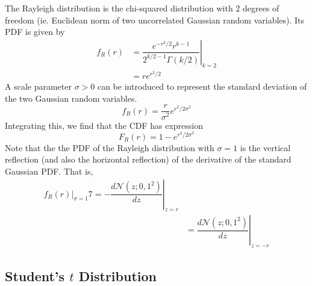 \documentclass[11pt]{report} %
\begin{document}
The Rayleigh distribution is the chi-squared distribution with 2 degrees of freedom (ie. Euclidean norm of two uncorrelated Gaussian random variables). Its PDF is given by
\begin{align}
f_{R}\left(r\right) &= \left.\dfrac{e^{-r^{2}/2}r^{k - 1}}{2^{k/2 - 1}\Gamma\left(k/2\right)}\right|_{k = 2}  \\
&= re^{r^{2}/2}
\end{align}
A scale parameter $\sigma > 0$  can be introduced to represent the standard deviation of the two Gaussian random variables.
\begin{equation}
f_{R}\left(r\right) = \dfrac{r}{\sigma^{2}}e^{r^{2}/2\sigma^{2}}
\end{equation}
Integrating this, we find that the CDF has expression
\begin{equation}
F_{R}\left(r\right) = 1 - e^{r^{2}/2\sigma^{2}}
\end{equation}
Note that the the PDF of the Rayleigh distribution with $\sigma = 1$ is the vertical reflection (and also the horizontal reflection) of the derivative of the standard Gaussian PDF. That is,
\begin{align}
\left.f_{R}\left(r\right)\right|_{\sigma = 1} 7= -\left.\dfrac{d\mathcal{N}\left(z; 0, 1^{2}\right)}{dz}\right|_{z = r} \\
&= \left.\dfrac{d\mathcal{N}\left(z; 0, 1^{2}\right)}{dz}\right|_{z = -r}
\end{align}

\subsection{Student's $t$ Distribution}
\end{document}
